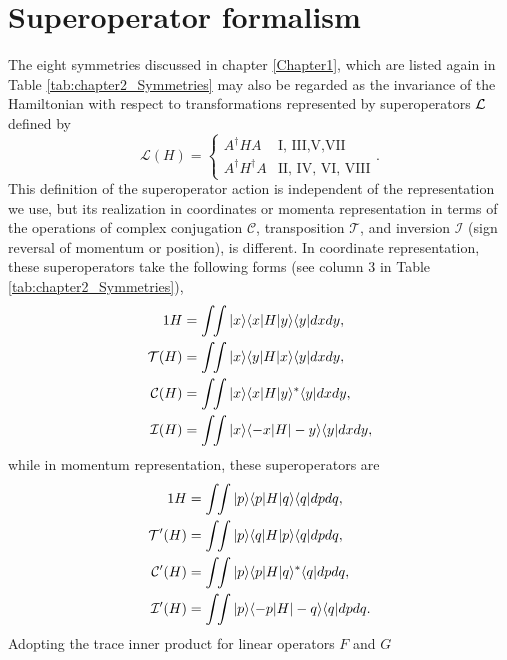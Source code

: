 \section{Superoperator formalism\label{sec:chapter2_super}}

The eight symmetries discussed in chapter \ref{Chapter1}, which are listed again in Table \ref{tab:chapter2_Symmetries} may also be regarded as the invariance of the Hamiltonian with respect to
transformations represented by superoperators ${\cal L}$ \cite{Simon2018} defined by
%
\begin{equation}
	\mathcal{L}(H)=
	\begin{cases}
		A^\dagger H A &  \text{I, III,V,VII} \\
		A^\dagger H^\dagger A &\text{II, IV, VI, VIII}
		\end{cases}.
\end{equation}
%
This definition of the superoperator action is independent of the representation we use, but its realization in coordinates or momenta representation in terms of the operations of complex conjugation $\mathcal{C}$, transposition $\mathcal{T}$, and inversion $\mathcal{I}$ (sign reversal of momentum or position), is different. In coordinate representation, these superoperators take the following forms (see column 3 in Table \ref{tab:chapter2_Symmetries}),
%
\begin{align}
	1 H&=\int\!\!\int |x\ra \la x|H|y\ra\la y| dx dy,
	\nonumber\\
	{\cal T} (H) &=\int\!\!\int |x\ra \la y|H|x\ra\la y| dx dy,
	\nonumber\\
	{\cal C} (H)&=\int\!\!\int |x\ra \la x|H|y\ra^*\la y| dx dy,
	\nonumber\\
	{\cal I} (H)&=\int\!\!\int |x\ra \la -x|H|-y\ra\la y| dx dy,
	\label{eq:chapter2_superoperatorsPosition}
\end{align}
%
while in momentum representation, these superoperators are
%
\begin{align}
	1 H&=\int\!\!\int |p\ra \la p|H|q\ra\la q| dp dq,
	\nonumber\\
	{\cal T}' (H) &=\int\!\!\int |p\ra \la q|H|p\ra\la q| dp dq,
	\nonumber\\
	{\cal C}' (H)&=\int\!\!\int |p\ra \la p|H|q\ra^*\la q| dp dq,
	\nonumber\\
	{\cal I}' (H)&=\int\!\!\int |p\ra \la -p|H|-q\ra\la q| dp dq.
	\label{eq:chapter2_superoperatorsMomentum}
\end{align}
%
Adopting the trace inner product for linear operators $F$ and $G$
%
